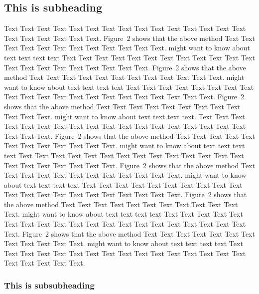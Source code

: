 \documentclass{bioinfo}
\begin{document}
\begin{methods}
\subsection{This is subheading}

Text Text Text Text Text Text  Text Text Text Text Text Text Text
Text Text  Text Text Text Text Text Text.
Figure~2\vphantom{\ref{fig:02}} shows that the above method  Text
Text Text Text  Text Text Text Text Text Text  Text Text.
\citealp{Boffelli03} might want to know about  text text text text
Text Text Text Text Text Text  Text Text Text Text Text Text Text
Text Text  Text Text Text Text Text Text.
Figure~2\vphantom{\ref{fig:02}} shows that the above method  Text
Text Text Text Text Text Text Text Text Text  Text Text.
\citealp{Boffelli03} might want to know about  text text text text
Text Text Text Text Text Text Text Text Text Text Text Text Text
Text Text  Text Text Text Text Text Text.
Figure~2\vphantom{\ref{fig:02}} shows that the above method  Text
Text Text Text Text Text Text Text Text Text  Text Text.
\citealp{Boffelli03} might want to know about  text text text
text. Text Text Text Text Text Text  Text Text Text Text Text Text
Text Text Text  Text Text Text Text Text Text.
Figure~2\vphantom{\ref{fig:02}} shows that the above method  Text
Text Text Text Text Text Text Text Text Text  Text Text.
\citealp{Boffelli03} might want to know about  text text text text
Text Text Text Text Text Text Text Text Text Text Text Text Text
Text Text  Text Text Text Text Text Text.
Figure~2\vphantom{\ref{fig:02}} shows that the above method  Text
Text Text Text Text Text Text Text Text Text  Text Text.
\citealp{Boffelli03} might want to know about  text text text text
Text Text Text Text Text Text  Text Text Text Text Text Text Text
Text Text  Text Text Text Text Text Text.
Figure~2\vphantom{\ref{fig:02}} shows that the above method  Text
Text Text Text Text Text Text Text Text Text  Text Text.
\citealp{Boffelli03} might want to know about  text text text text
Text Text Text Text Text Text Text Text Text Text Text Text Text
Text Text  Text Text Text Text Text Text.
Figure~2\vphantom{\ref{fig:02}} shows that the above method  Text
Text Text Text Text Text Text Text Text Text  Text Text.
\citealp{Boffelli03} might want to know about  text text text text
Text Text Text Text Text Text  Text Text Text Text Text Text Text
Text Text  Text Text Text Text Text Text.


\subsubsection{This is subsubheading}


\end{methods}
\end{document}
